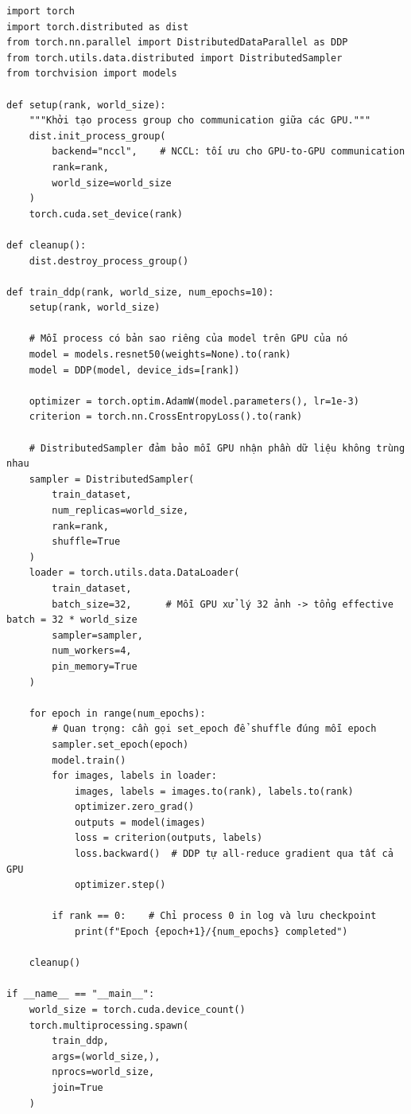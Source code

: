 \begin{verbatim}
import torch
import torch.distributed as dist
from torch.nn.parallel import DistributedDataParallel as DDP
from torch.utils.data.distributed import DistributedSampler
from torchvision import models

def setup(rank, world_size):
    """Khởi tạo process group cho communication giữa các GPU."""
    dist.init_process_group(
        backend="nccl",    # NCCL: tối ưu cho GPU-to-GPU communication
        rank=rank,
        world_size=world_size
    )
    torch.cuda.set_device(rank)

def cleanup():
    dist.destroy_process_group()

def train_ddp(rank, world_size, num_epochs=10):
    setup(rank, world_size)

    # Mỗi process có bản sao riêng của model trên GPU của nó
    model = models.resnet50(weights=None).to(rank)
    model = DDP(model, device_ids=[rank])

    optimizer = torch.optim.AdamW(model.parameters(), lr=1e-3)
    criterion = torch.nn.CrossEntropyLoss().to(rank)

    # DistributedSampler đảm bảo mỗi GPU nhận phần dữ liệu không trùng nhau
    sampler = DistributedSampler(
        train_dataset,
        num_replicas=world_size,
        rank=rank,
        shuffle=True
    )
    loader = torch.utils.data.DataLoader(
        train_dataset,
        batch_size=32,      # Mỗi GPU xử lý 32 ảnh -> tổng effective batch = 32 * world_size
        sampler=sampler,
        num_workers=4,
        pin_memory=True
    )

    for epoch in range(num_epochs):
        # Quan trọng: cần gọi set_epoch để shuffle đúng mỗi epoch
        sampler.set_epoch(epoch)
        model.train()
        for images, labels in loader:
            images, labels = images.to(rank), labels.to(rank)
            optimizer.zero_grad()
            outputs = model(images)
            loss = criterion(outputs, labels)
            loss.backward()  # DDP tự all-reduce gradient qua tất cả GPU
            optimizer.step()

        if rank == 0:    # Chỉ process 0 in log và lưu checkpoint
            print(f"Epoch {epoch+1}/{num_epochs} completed")

    cleanup()

if __name__ == "__main__":
    world_size = torch.cuda.device_count()
    torch.multiprocessing.spawn(
        train_ddp,
        args=(world_size,),
        nprocs=world_size,
        join=True
    )
\end{verbatim}

